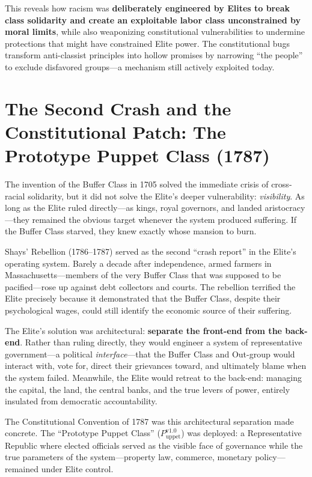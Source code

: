 \documentclass[12pt,openany]{book}
\begin{document}
This reveals how racism was \textbf{deliberately engineered by Elites to break class solidarity and create an exploitable labor class unconstrained by moral limits}, while also weaponizing constitutional vulnerabilities to undermine protections that might have constrained Elite power. The constitutional bugs transform anti-classist principles into hollow promises by narrowing ``the people'' to exclude disfavored groups---a mechanism still actively exploited today.

\section{The Second Crash and the Constitutional Patch: The Prototype Puppet Class (1787)}

The invention of the Buffer Class in 1705 solved the immediate crisis of cross-racial solidarity, but it did not solve the Elite's deeper vulnerability: \textit{visibility}. As long as the Elite ruled directly---as kings, royal governors, and landed aristocracy---they remained the obvious target whenever the system produced suffering. If the Buffer Class starved, they knew exactly whose mansion to burn.

Shays' Rebellion (1786--1787) served as the second ``crash report'' in the Elite's operating system. Barely a decade after independence, armed farmers in Massachusetts---members of the very Buffer Class that was supposed to be pacified---rose up against debt collectors and courts. The rebellion terrified the Elite precisely because it demonstrated that the Buffer Class, despite their psychological wages, could still identify the economic source of their suffering.

The Elite's solution was architectural: \textbf{separate the front-end from the back-end}. Rather than ruling directly, they would engineer a system of representative government---a political \textit{interface}---that the Buffer Class and Out-group would interact with, vote for, direct their grievances toward, and ultimately blame when the system failed. Meanwhile, the Elite would retreat to the back-end: managing the capital, the land, the central banks, and the true levers of power, entirely insulated from democratic accountability.

The Constitutional Convention of 1787 was this architectural separation made concrete. The ``Prototype Puppet Class'' ($P_{\text{uppet}}^{\text{v1.0}}$) was deployed: a Representative Republic where elected officials served as the visible face of governance while the true parameters of the system---property law, commerce, monetary policy---remained under Elite control.
\end{document}
